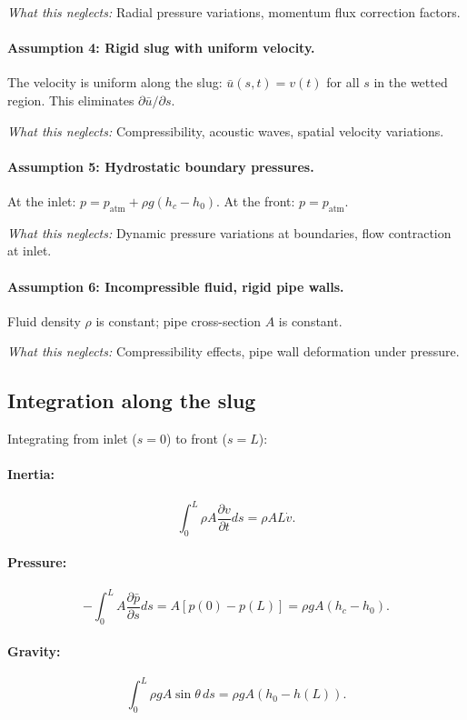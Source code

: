 \documentclass[11pt]{article}
\begin{document}
\emph{What this neglects:} Radial pressure variations, momentum flux correction factors.

\paragraph{Assumption 4: Rigid slug with uniform velocity.}
The velocity is uniform along the slug: $\bar{u}(s,t) = v(t)$ for all $s$ in the wetted region. This eliminates $\partial\bar{u}/\partial s$.

\emph{What this neglects:} Compressibility, acoustic waves, spatial velocity variations.

\paragraph{Assumption 5: Hydrostatic boundary pressures.}
At the inlet: $p = p_{\text{atm}} + \rho g(h_c - h_0)$. At the front: $p = p_{\text{atm}}$.

\emph{What this neglects:} Dynamic pressure variations at boundaries, flow contraction at inlet.

\paragraph{Assumption 6: Incompressible fluid, rigid pipe walls.}
Fluid density $\rho$ is constant; pipe cross-section $A$ is constant.

\emph{What this neglects:} Compressibility effects, pipe wall deformation under pressure.

\subsection{Integration along the slug}

Integrating from inlet ($s = 0$) to front ($s = L$):

\paragraph{Inertia:}
\[
  \int_0^L \rho A \frac{\partial v}{\partial t} ds = \rho A L \dot{v}.
\]

\paragraph{Pressure:}
\[
  -\int_0^L A \frac{\partial \bar{p}}{\partial s} ds = A[p(0) - p(L)] = \rho g A(h_c - h_0).
\]

\paragraph{Gravity:}
\[
  \int_0^L \rho g A \sin\theta \, ds = \rho g A(h_0 - h(L)).
\]
\end{document}
